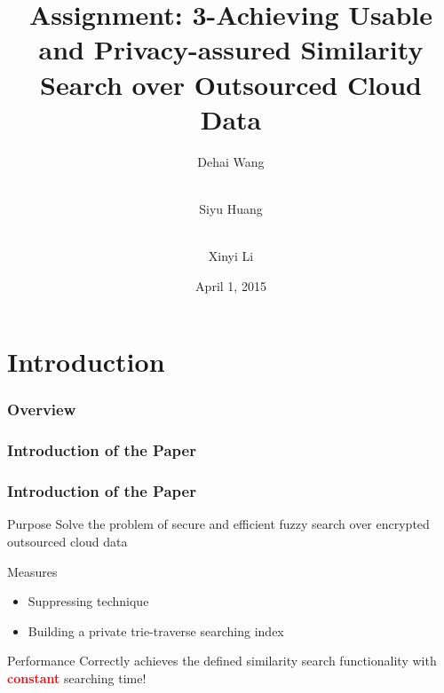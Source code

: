 \documentclass{beamer}
\title[Assignment3]{Assignment: 3-Achieving Usable and Privacy-assured Similarity Search over Outsourced Cloud Data} %
\author[Author, Another, Another] %
{Dehai Wang \and \\Siyu Huang\and \\ Xinyi Li}
\institute[DLUT] %
{
Dalian University of Technology \\
\textit{Assignment of System Security} %
\medskip %
}
\date{April 1, 2015} %
\begin{document}
\section{Introduction}
\begin{frame}
\titlepage %
\end{frame}

\begin{frame}
	\frametitle{Overview} %
	\tableofcontents %
\end{frame}
\begin{frame}
	\frametitle{Introduction of the Paper}
	    
\end{frame}

\begin{frame}
 \frametitle{Introduction of the Paper}
 \begin{block}{Purpose}
  Solve the problem of secure and efficient fuzzy search over encrypted outsourced cloud data
  \end{block}
  
  \begin{block}{Measures}
  	\begin{itemize}
  		\item Suppressing technique 
  		\item Building a private trie-traverse searching index
  	\end{itemize}
  \end{block}
  
  \begin{block}{Performance}
	  Correctly achieves the defined similarity search functionality with \textbf{\textcolor{red}{constant}}  searching time!
  \end{block}
  
  
\end{frame}


\end{document}
